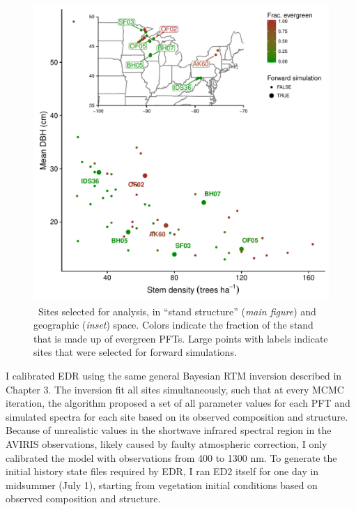 \begin{figure}
  \centering
  \includegraphics[width=\textwidth]{figures/sites_both.pdf}
  \caption{\
    Sites selected for analysis, in ``stand structure'' (\textit{main figure}) and geographic (\textit{inset}) space.
    Colors indicate the fraction of the stand that is made up of evergreen PFTs.
    Large points with labels indicate sites that were selected for forward simulations.
  }\label{fig:sites}
\end{figure}
% 
% 

I calibrated EDR using the same general Bayesian RTM inversion described in Chapter 3.
The inversion fit all sites simultaneously, such that at every MCMC iteration, the algorithm proposed a set of all parameter values for each PFT and simulated spectra for each site based on its observed composition and structure.
Because of unrealistic values in the shortwave infrared spectral region in the AVIRIS observations, likely caused by faulty atmospheric correction, I only calibrated the model with observations from 400 to 1300 nm.
To generate the initial history state files required by EDR, I ran ED2 itself for one day in midsummer (July 1), starting from vegetation initial conditions based on observed composition and structure.

